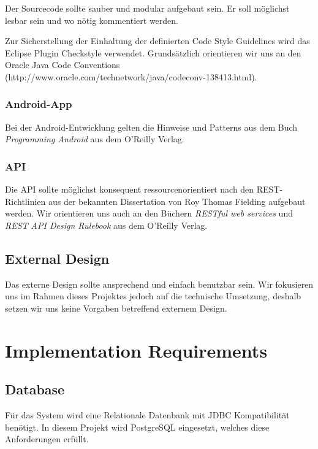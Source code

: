 \documentclass[10pt,a4paper]{scrartcl}
\begin{document}
	Der Sourcecode sollte sauber und modular aufgebaut sein. Er soll möglichst lesbar sein und wo nötig kommentiert werden.

	Zur Sicherstellung der Einhaltung der definierten Code Style Guidelines wird das Eclipse Plugin
	Checkstyle verwendet. Grundsätzlich orientieren wir uns an den Oracle Java Code Conventions
	(http://www.oracle.com/technetwork/java/codeconv-138413.html).

		\subsubsection{Android-App}

		Bei der Android-Entwicklung gelten die Hinweise und Patterns aus dem Buch \textit{Programming Android}\cite{mednieks2012programming} aus dem O'Reilly Verlag.

		\subsubsection{API}

		Die API sollte möglichst konsequent ressourcenorientiert nach den REST-Richtlinien aus der bekannten Dissertation von Roy Thomas Fielding\cite{Fielding:2000:ASD:932295} aufgebaut werden. Wir orientieren uns auch an den Büchern \textit{RESTful web services}\cite{richardson2007restful} und \textit{REST API Design Rulebook}\cite{masse2011rest} aus dem O'Reilly Verlag.

	\subsection{External Design}

	Das externe Design sollte ansprechend und einfach benutzbar sein. Wir fokusieren uns im Rahmen dieses Projektes jedoch auf die technische Umsetzung, deshalb setzen wir uns keine Vorgaben betreffend externem Design.


\section{Implementation Requirements}

	\subsection{Database}

	Für das System wird eine Relationale Datenbank mit JDBC Kompatibilität benötigt.
	In diesem Projekt wird PostgreSQL eingesetzt, welches diese Anforderungen erfüllt.
\end{document}
